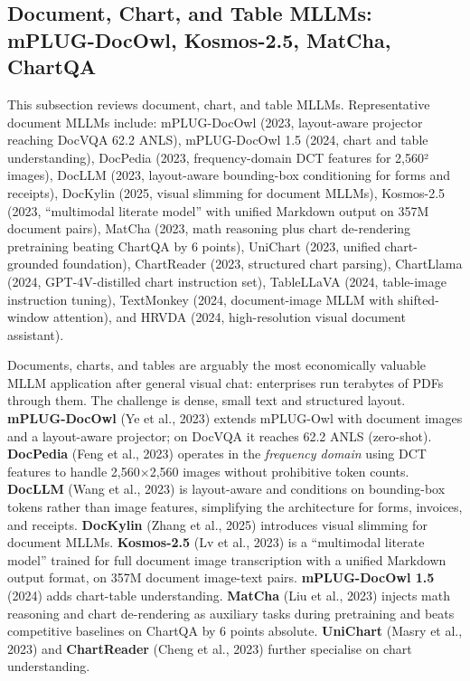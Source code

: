 \subsection{Document, Chart, and Table MLLMs: mPLUG-DocOwl, Kosmos-2.5, MatCha, ChartQA}\label{document-chart-and-table-mllms-mplug-docowl-kosmos-2.5-matcha-chartqa}

This subsection reviews document, chart, and table MLLMs. Representative document MLLMs include: mPLUG-DocOwl (2023, layout-aware projector reaching DocVQA 62.2 ANLS), mPLUG-DocOwl 1.5 (2024, chart and table understanding), DocPedia (2023, frequency-domain DCT features for 2,560² images), DocLLM (2023, layout-aware bounding-box conditioning for forms and receipts), DocKylin (2025, visual slimming for document MLLMs), Kosmos-2.5 (2023, ``multimodal literate model'' with unified Markdown output on 357M document pairs), MatCha (2023, math reasoning plus chart de-rendering pretraining beating ChartQA by 6 points), UniChart (2023, unified chart-grounded foundation), ChartReader (2023, structured chart parsing), ChartLlama (2024, GPT-4V-distilled chart instruction set), TableLLaVA (2024, table-image instruction tuning), TextMonkey (2024, document-image MLLM with shifted-window attention), and HRVDA (2024, high-resolution visual document assistant).

Documents, charts, and tables are arguably the most economically valuable MLLM application after general visual chat: enterprises run terabytes of PDFs through them. The challenge is dense, small text and structured layout. \textbf{mPLUG-DocOwl} (Ye et al., 2023) extends mPLUG-Owl with document images and a layout-aware projector; on DocVQA it reaches 62.2 ANLS (zero-shot). \textbf{DocPedia} (Feng et al., 2023) operates in the \emph{frequency domain} using DCT features to handle 2,560×2,560 images without prohibitive token counts. \textbf{DocLLM} (Wang et al., 2023) is layout-aware and conditions on bounding-box tokens rather than image features, simplifying the architecture for forms, invoices, and receipts. \textbf{DocKylin} (Zhang et al., 2025) introduces visual slimming for document MLLMs. \textbf{Kosmos-2.5} (Lv et al., 2023) is a ``multimodal literate model'' trained for full document image transcription with a unified Markdown output format, on 357M document image-text pairs. \textbf{mPLUG-DocOwl 1.5} (2024) adds chart-table understanding. \textbf{MatCha} (Liu et al., 2023) injects math reasoning and chart de-rendering as auxiliary tasks during pretraining and beats competitive baselines on ChartQA by 6 points absolute. \textbf{UniChart} (Masry et al., 2023) and \textbf{ChartReader} (Cheng et al., 2023) further specialise on chart understanding.

